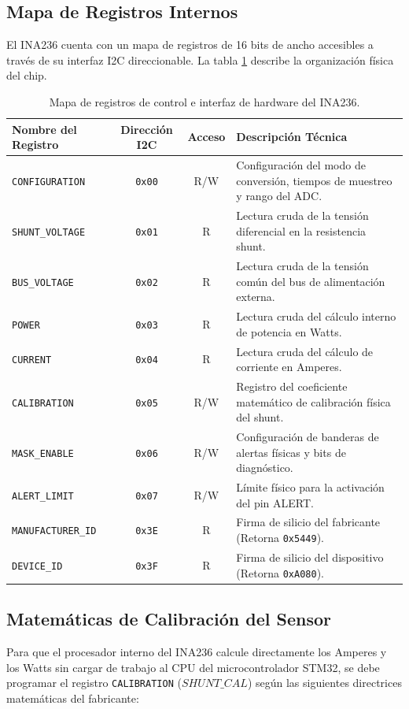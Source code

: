 \documentclass[
10pt, %
a4paper, %
oneside, %
headinclude,footinclude, %
BCOR5mm, %
]{scrartcl}
\begin{document}
\subsection{Mapa de Registros Internos}
El INA236 cuenta con un mapa de registros de 16 bits de ancho accesibles a través de su interfaz I2C direccionable. La tabla \ref{tab_registers} describe la organización física del chip.

\begin{table}[H]
	\centering
	\begin{tabular}{lccl}
		\toprule
		\textbf{Nombre del Registro} & \textbf{Dirección I2C} & \textbf{Acceso} & \textbf{Descripción Técnica} \\
		\midrule
		\texttt{CONFIGURATION} & \texttt{0x00} & R/W & Configuración del modo de conversión, tiempos de muestreo y rango del ADC. \\
		\texttt{SHUNT\_VOLTAGE} & \texttt{0x01} & R & Lectura cruda de la tensión diferencial en la resistencia shunt. \\
		\texttt{BUS\_VOLTAGE} & \texttt{0x02} & R & Lectura cruda de la tensión común del bus de alimentación externa. \\
		\texttt{POWER} & \texttt{0x03} & R & Lectura cruda del cálculo interno de potencia en Watts. \\
		\texttt{CURRENT} & \texttt{0x04} & R & Lectura cruda del cálculo de corriente en Amperes. \\
		\texttt{CALIBRATION} & \texttt{0x05} & R/W & Registro del coeficiente matemático de calibración física del shunt. \\
		\texttt{MASK\_ENABLE} & \texttt{0x06} & R/W & Configuración de banderas de alertas físicas y bits de diagnóstico. \\
		\texttt{ALERT\_LIMIT} & \texttt{0x07} & R/W & Límite físico para la activación del pin ALERT. \\
		\texttt{MANUFACTURER\_ID} & \texttt{0x3E} & R & Firma de silicio del fabricante (Retorna \texttt{0x5449}). \\
		\texttt{DEVICE\_ID} & \texttt{0x3F} & R & Firma de silicio del dispositivo (Retorna \texttt{0xA080}). \\
		\bottomrule
	\end{tabular}
	\caption{Mapa de registros de control e interfaz de hardware del INA236.}\label{tab_registers}
\end{table}

\subsection{Matemáticas de Calibración del Sensor}
Para que el procesador interno del INA236 calcule directamente los Amperes y los Watts sin cargar de trabajo al CPU del microcontrolador STM32, se debe programar el registro \texttt{CALIBRATION} ($SHUNT\_CAL$) según las siguientes directrices matemáticas del fabricante:
\end{document}
